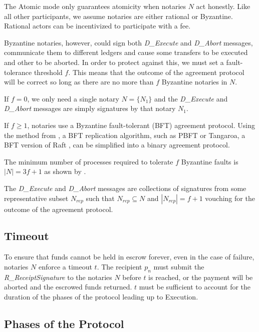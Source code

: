 \documentclass[letterpaper,twocolumn,10pt]{article}
\begin{document}
The Atomic mode only guarantees atomicity when notaries $N$ act honestly. Like all other participants, we assume notaries are either rational or Byzantine. Rational actors can be incentivized to participate with a fee.

Byzantine notaries, however, could sign both \textit{D\_Execute} and \textit{D\_Abort} messages, communicate them to different ledgers and cause some transfers to be executed and other to be aborted. In order to protect against this, we must set a fault-tolerance threshold $f$. This means that the outcome of the agreement protocol will be correct so long as there are no more than $f$ Byzantine notaries in $N$.

If $f = 0$, we only need a single notary $N = \{ N_1 \}$ and the \textit{D\_Execute} and \textit{D\_Abort} messages are simply signatures by that notary $N_1$.

If $f \geq 1$, notaries use a Byzantine fault-tolerant (BFT) agreement protocol. Using the method from \cite{gray2006consensus,mohan1983method}, a BFT replication algorithm, such as PBFT \cite{castro1999practical} or Tangaroa, a BFT version of Raft \cite{copelandtangaroa}, can be simplified into a binary agreement protocol.

The minimum number of processes required to tolerate $f$ Byzantine faults is $\left\vert{N}\right\vert = 3f + 1$ as shown by \cite{bracha1985asynchronous}.

The \textit{D\_Execute} and \textit{D\_Abort} messages are collections of signatures from some representative subset $N_{rep}$ such that $N_{rep} \subseteq N$ and $|N_{rep}| = f+1$ vouching for the outcome of the agreement protocol.

\subsection{Timeout}
\label{subsec:timeout}


To ensure that funds cannot be held in escrow forever, even in the case of failure, notaries $N$ enforce a timeout $t$. The recipient $p_n$ must submit the \textit{R\_ReceiptSignature} to the notaries $N$ before $t$ is reached, or the payment will be aborted and the escrowed funds returned. $t$ must be sufficient to account for the duration of the phases of the protocol leading up to Execution.

\subsection{Phases of the Protocol}
\end{document}
